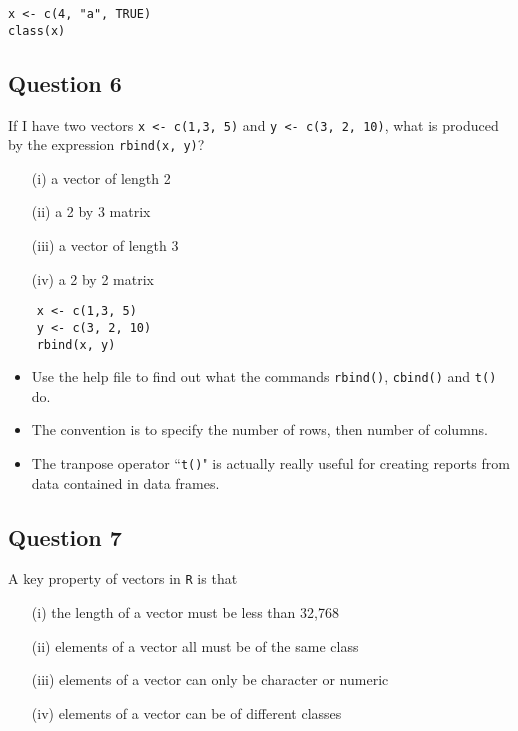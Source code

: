 \documentclass[12pt]{article}
\begin{document}
\begin{framed}
\begin{verbatim}
x <- c(4, "a", TRUE)
class(x)
\end{verbatim}	
\end{framed}
\newpage
\subsection*{Question 6}
\Large
If I have two vectors \texttt{x <- c(1,3, 5)} and \texttt{y <- c(3, 2, 10)}, what is produced by the expression 
\texttt{rbind(x, y)}?

\begin{itemize}
	\item[(i)] a vector of length 2
	\item[(ii)] a 2 by 3 matrix
	\item[(iii)] a vector of length 3
	\item[(iv)] a 2 by 2 matrix
\end{itemize}

\begin{framed}
	\begin{verbatim}
	x <- c(1,3, 5)
	y <- c(3, 2, 10)
	rbind(x, y)
	\end{verbatim}	
\end{framed}
\begin{itemize}
\item Use the help file to find out what the commands \texttt{rbind()}, \texttt{cbind()} and \texttt{t()} do.
\item The convention is to specify the number of rows, then number of columns.
\item The tranpose operator ``\texttt{t()}" is actually really useful for creating reports from data contained in data frames.
\end{itemize}




\newpage
\subsection*{Question 7}
\Large
A key property of vectors in \texttt{R} is that
\begin{itemize}
	\item[(i)] the length of a vector must be less than 32,768
	\item[(ii)] elements of a vector all must be of the same class
	\item[(iii)] elements of a vector can only be character or numeric
	\item[(iv)] elements of a vector can be of different classes
\end{itemize}
\end{document}
